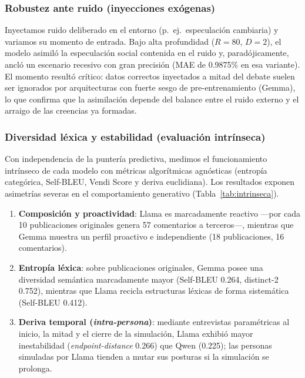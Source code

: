 \documentclass[11pt]{article}
\begin{document}
\subsubsection{Robustez ante ruido (inyecciones exógenas)}

Inyectamos ruido deliberado en el entorno (p.\ ej.\ especulación cambiaria) y variamos su momento de entrada. Bajo alta profundidad ($R=80$, $D=2$), el modelo asimiló la especulación social contenida en el ruido y, paradójicamente, ancló un escenario recesivo con gran precisión (MAE de 0.9875\% en esa variante). El momento resultó crítico: datos correctos inyectados a mitad del debate suelen ser ignorados por arquitecturas con fuerte sesgo de pre-entrenamiento (Gemma), lo que confirma que la asimilación depende del balance entre el ruido externo y el arraigo de las creencias ya formadas.

\subsubsection{Diversidad léxica y estabilidad (evaluación intrínseca)}

Con independencia de la puntería predictiva, medimos el funcionamiento intrínseco de cada modelo con métricas algorítmicas agnósticas (entropía categórica, Self-BLEU, Vendi Score y deriva euclidiana). Los resultados exponen asimetrías severas en el comportamiento generativo (Tabla~\ref{tab:intrinseca}).

\begin{enumerate}
    \item \textbf{Composición y proactividad}: Llama es marcadamente reactivo —por cada 10 publicaciones originales genera 57 comentarios a terceros—, mientras que Gemma muestra un perfil proactivo e independiente (18 publicaciones, 16 comentarios).
    \item \textbf{Entropía léxica}: sobre publicaciones originales, Gemma posee una diversidad semántica marcadamente mayor (Self-BLEU 0.264, distinct-2 0.752), mientras que Llama recicla estructuras léxicas de forma sistemática (Self-BLEU 0.412).
    \item \textbf{Deriva temporal (\textit{intra-persona})}: mediante entrevistas paramétricas al inicio, la mitad y el cierre de la simulación, Llama exhibió mayor inestabilidad (\textit{endpoint-distance} 0.266) que Qwen (0.225); las personas simuladas por Llama tienden a mutar sus posturas si la simulación se prolonga.
\end{enumerate}
\end{document}
